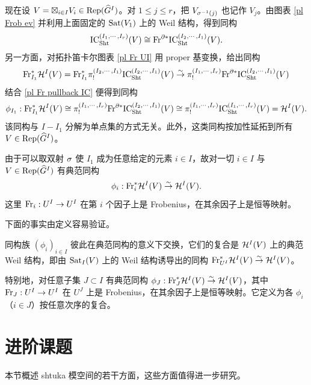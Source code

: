 现在设 $V=\boxtimes_{i\in I}V_{i}\in \textup{Rep}(\widehat{G}^{I})$。对 $1\le j\le r$，把 $V_{\sigma^{-1}(j)}$ 也记作 $V_{j}$。由图表 \eqref{pl Frob ev} 并利用上面固定的 $\mathrm{Sat}(V_{1})$ 上的 Weil 结构，得到同构
\begin{equation}\label{pl Fr pullback IC}
\textup{IC}^{(I_{1},\cdots, I_{r})}_{\textup{Sht}}(V)\cong \textup{Fr}^{\partial*}\textup{IC}^{(I_{2},\cdots, I_{1})}_{\textup{Sht}}(V).
\end{equation}
另一方面，对拓扑笛卡尔图表 \eqref{pl Fr UI} 用 proper 基变换，给出同构
\begin{equation*}
\textup{Fr}_{I_{1}}^{*}\mathcal{H}^{I}(V)= \textup{Fr}_{I_{1}}^{*}\pi^{(I_{2},\cdots, I_{1})}_{!}\textup{IC}^{(I_{2},\cdots, I_{1})}_{\textup{Sht}}(V)\stackrel{\sim}{\to}  \pi^{(I_{1},\cdots, I_{r})}_{!}\textup{Fr}^{\partial*}\textup{IC}^{(I_{2},\cdots, I_{1})}_{\textup{Sht}}(V)
\end{equation*}
结合 \eqref{pl Fr pullback IC} 便得到同构
\begin{equation*}
\phi_{I_{1}}: \textup{Fr}_{I_{1}}^{*}\mathcal{H}^{I}(V)\cong \pi^{(I_{1},\cdots, I_{r})}_{!}\textup{Fr}^{\partial*}\textup{IC}^{(I_{2},\cdots, I_{1})}_{\textup{Sht}}(V)\cong \pi^{(I_{1},\cdots, I_{r})}_{!}\textup{IC}^{(I_{1},\cdots, I_{r})}_{\textup{Sht}}(V)=\mathcal{H}^{I}(V).
\end{equation*}
该同构与 $I-I_{1}$ 分解为单点集的方式无关。此外，这类同构按加性延拓到所有 $V\in \textup{Rep}(\widehat{G}^{I})$。

由于可以取双射 $\sigma$ 使 $I_{1}$ 成为任意给定的元素 $i\in I$，故对一切 $i\in I$ 与 $V\in\textup{Rep}(\widehat{G}^{I})$ 有典范同构
\begin{equation*}
\phi_{i}:  \textup{Fr}_{i}^{*}\mathcal{H}^{I}(V)\stackrel{\sim}{\to}  \mathcal{H}^{I}(V).
\end{equation*}
这里 $\textup{Fr}_{i}: U^{I}\to U^{I}$ 在第 $i$ 个因子上是 Frobenius，在其余因子上是恒等映射。

下面的事实由定义容易验证。
\begin{prop}
同构族 $(\phi_{i})_{i\in I}$ 彼此在典范同构的意义下交换，它们的复合是 $\mathcal{H}^{I}(V)$ 上的典范 Weil 结构，即由 $\mathrm{Sat}_{I}(V)$ 上的 Weil 结构诱导出的同构 $\textup{Fr}^{*}_{U^{I}}\mathcal{H}^{I}(V)\stackrel{\sim}{\to}  \mathcal{H}^{I}(V)$。
\end{prop}

特别地，对任意子集 $J\subset I$ 有典范同构 $\phi_{J}: \textup{Fr}_{J}^{*}\mathcal{H}^{I}(V)\stackrel{\sim}{\to}  \mathcal{H}^{I}(V)$，其中 $\textup{Fr}_{J}: U^{I}\to U^{I}$ 在 $U^{J}$ 上是 Frobenius，在其余因子上是恒等映射。它定义为各 $\phi_{i}$（$i\in J$）按任意次序的复合。

\section{进阶课题}\label{s:adv}
本节概述 shtuka 模空间的若干方面，这些方面值得进一步研究。

